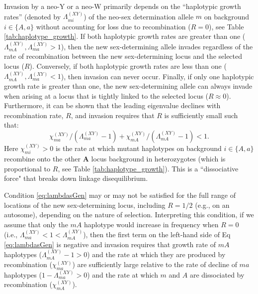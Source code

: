 \documentclass[10pt,letterpaper]{article}
\begin{document}
Invasion by a neo-Y or a neo-W primarily depends on the ``haplotypic growth rates'' (denoted by $\Lambda_{mi}^{(XY)}$) of the neo-sex determination allele $m$ on background $i\in\{A,a\}$ without accounting for loss due to recombination ($R=0$), see Table \ref{tab:haplotype_growth}.
If both haplotypic growth rates are greater than one ($\Lambda_{mA}^{(XY)}, \Lambda_{ma}^{(XY)}>1$), then the new sex-determining allele invades regardless of the rate of recombination between the new sex-determining locus and the selected locus ($R$).
Conversely, if both haplotypic growth rates are less than one ($\Lambda_{mA}^{(XY)}, \Lambda_{ma}^{(XY)}<1$), then invasion can never occur.  
Finally, if only one haplotypic growth rate is greater than one, the new sex-determining allele can always invade when arising at a locus that is tightly linked to the selected locus ($R\approx0$).  
Furthermore, it can be shown that the leading eigenvalue declines with recombination rate, $R$, and invasion requires that $R$ is sufficiently small such that: 
\begin{equation}\label{eq:lambdasGen}
\chi_{ma}^{(XY)}/\left(\Lambda_{ma}^{(XY)} - 1\right) + \chi_{mA}^{(XY)}/\left(\Lambda_{mA}^{(XY)} - 1\right) < 1.
\end{equation}
\noindent 
Here $\chi_{mi}^{(XY)}>0$ is the rate at which mutant haplotypes on background $i\in\{A,a\}$ recombine onto the other $\mathbf{A}$ locus background in heterozygotes (which is proportional to $R$,  see Table \ref{tab:haplotype_growth}).
This is a ``dissociative force" that breaks down linkage disequilibrium.

Condition \ref{eq:lambdasGen} may or may not be satisfied for the full range of locations of the new sex-determining locus, including $R=1/2$ (e.g., on an autosome), depending on the nature of selection.  
Interpreting this condition, if we assume that only the $mA$ haplotype would increase in frequency when $R=0$ (i.e., $\Lambda_{ma}^{(XY)}<1<\Lambda_{mA}^{(XY)}$), then the first term on the left-hand side of Eq \eqref{eq:lambdasGen} is negative and invasion requires that growth rate of $mA$ haplotypes ($\Lambda_{mA}^{(XY)}-1>0$) and the rate at which they are produced by recombination ($\chi_{ma}^{(XY)}$) are sufficiently large relative to the rate of decline of $ma$ haplotypes ($1-\Lambda_{ma}^{(XY)}>0$) and the rate at which $m$ and $A$ are dissociated by recombination ($\chi_{mA}^{(XY)}$).
\end{document}
